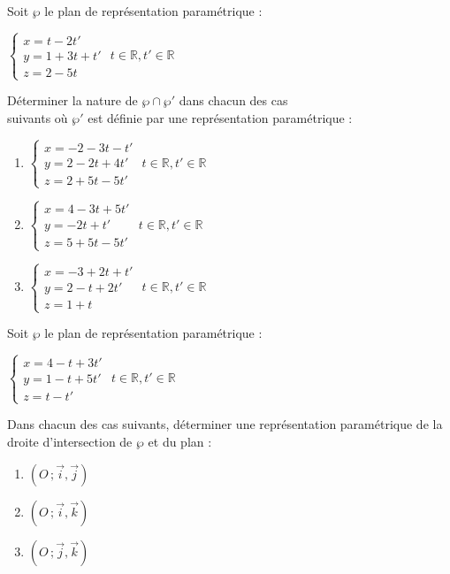 \documentclass{cornouaille}
\begin{document}
\begin{exercice}
  Soit $\wp$ le plan de représentation paramétrique :

\begin{center}
  $\begin{cases}x=t-2t' \\y=1+3t+t' \\z=2-5t \end{cases}$
  $t\in\mathbb{R}, t'\in\mathbb{R}$
\end{center}

Déterminer la nature de $\wp\cap\wp'$ dans chacun des cas\\
suivants où $\wp'$ est définie par une représentation paramétrique :
\begin{enumerate}
\item \begin{center}
    $\begin{cases}x=-2-3t-t' \\y=2-2t+4t' \\z=2+5t-5t' \end{cases}$
    $t\in\mathbb{R}, t'\in\mathbb{R}$
  \end{center}
\item \begin{center}
    $\begin{cases}x=4-3t+5t' \\y=-2t+t' \\z=5+5t-5t' \end{cases}$
    $t\in\mathbb{R}, t'\in\mathbb{R}$
  \end{center}
\item \begin{center}
    $\begin{cases}x=-3+2t+t' \\y=2-t+2t' \\z=1+t \end{cases}$
    $t\in\mathbb{R}, t'\in\mathbb{R}$
  \end{center}
\end{enumerate}
\end{exercice}

\begin{exercice}
  Soit $\wp$ le plan de représentation paramétrique :
  \begin{center}
    $\begin{cases}x=4-t+3t' \\y=1-t+5t' \\z=t-t' \end{cases}$
    $t\in\mathbb{R}, t'\in\mathbb{R}$
  \end{center}Dans chacun des cas suivants, déterminer une
  représentation paramétrique de la droite d'intersection de $\wp$ et
  du plan :
  \begin{enumerate}
  \item $(O\,;\overrightarrow{i},\overrightarrow{j})$
  \item $(O\,;\overrightarrow{i},\overrightarrow{k})$
  \item $(O\,;\overrightarrow{j},\overrightarrow{k})$
  \end{enumerate}
\end{exercice}
\end{document}
